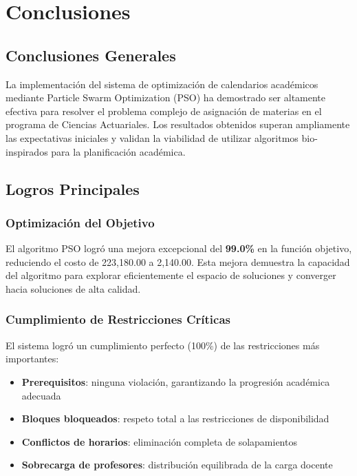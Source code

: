 \section{Conclusiones}

\subsection{Conclusiones Generales}

La implementación del sistema de optimización de calendarios académicos mediante Particle Swarm Optimization (PSO) ha demostrado ser altamente efectiva para resolver el problema complejo de asignación de materias en el programa de Ciencias Actuariales. Los resultados obtenidos superan ampliamente las expectativas iniciales y validan la viabilidad de utilizar algoritmos bio-inspirados para la planificación académica.

\subsection{Logros Principales}

\subsubsection{Optimización del Objetivo}
El algoritmo PSO logró una mejora excepcional del \textbf{99.0\%} en la función objetivo, reduciendo el costo de 223,180.00 a 2,140.00. Esta mejora demuestra la capacidad del algoritmo para explorar eficientemente el espacio de soluciones y converger hacia soluciones de alta calidad.

\subsubsection{Cumplimiento de Restricciones Críticas}
El sistema logró un cumplimiento perfecto (100\%) de las restricciones más importantes:
\begin{itemize}
    \item \textbf{Prerequisitos}: ninguna violación, garantizando la progresión académica adecuada
    \item \textbf{Bloques bloqueados}: respeto total a las restricciones de disponibilidad
    \item \textbf{Conflictos de horarios}: eliminación completa de solapamientos
    \item \textbf{Sobrecarga de profesores}: distribución equilibrada de la carga docente
\end{itemize}

